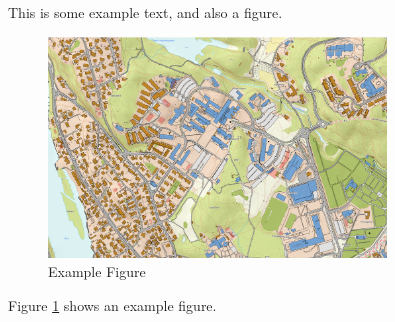 \documentclass[../main.tex]{subfiles}
\begin{document}
This is some example text, and also a figure.

\begin{figure}[H]
  \centering
  \includegraphics[width=0.8\textwidth]{img/example.png}
  \caption{Example Figure}
  \label{fig:example}
\end{figure}

Figure \ref{fig:example} shows an example figure.
\end{document}
